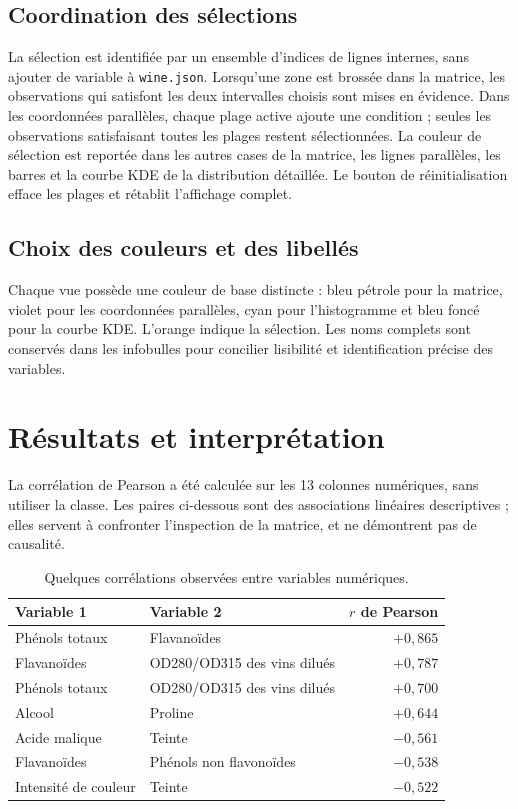 \documentclass[11pt,a4paper]{article}
\begin{document}
\subsection{Coordination des sélections}
La sélection est identifiée par un ensemble d'indices de lignes internes, sans ajouter de variable à \texttt{wine.json}. Lorsqu'une zone est brossée dans la matrice, les observations qui satisfont les deux intervalles choisis sont mises en évidence. Dans les coordonnées parallèles, chaque plage active ajoute une condition ; seules les observations satisfaisant toutes les plages restent sélectionnées. La couleur de sélection est reportée dans les autres cases de la matrice, les lignes parallèles, les barres et la courbe KDE de la distribution détaillée. Le bouton de réinitialisation efface les plages et rétablit l'affichage complet.

\subsection{Choix des couleurs et des libellés}
Chaque vue possède une couleur de base distincte : bleu pétrole pour la matrice, violet pour les coordonnées parallèles, cyan pour l'histogramme et bleu foncé pour la courbe KDE. L'orange indique la sélection. Les noms complets sont conservés dans les infobulles pour concilier lisibilité et identification précise des variables.

\section{Résultats et interprétation}
La corrélation de Pearson a été calculée sur les 13 colonnes numériques, sans utiliser la classe. Les paires ci-dessous sont des associations linéaires descriptives ; elles servent à confronter l'inspection de la matrice, et ne démontrent pas de causalité.

\begin{table}[H]
\centering
\small
\caption{Quelques corrélations observées entre variables numériques.}
\label{tab:correlations}
\begin{tabularx}{.92\textwidth}{@{}>{\raggedright\arraybackslash}X>{\raggedright\arraybackslash}Xr@{}}
\toprule
\textbf{Variable 1} & \textbf{Variable 2} & \textbf{$r$ de Pearson} \\
\midrule
Phénols totaux & Flavanoïdes & $+0{,}865$ \\
Flavanoïdes & OD280/OD315 des vins dilués & $+0{,}787$ \\
Phénols totaux & OD280/OD315 des vins dilués & $+0{,}700$ \\
Alcool & Proline & $+0{,}644$ \\
Acide malique & Teinte & $-0{,}561$ \\
Flavanoïdes & Phénols non flavonoïdes & $-0{,}538$ \\
Intensité de couleur & Teinte & $-0{,}522$ \\
\bottomrule
\end{tabularx}
\end{table}
\end{document}

